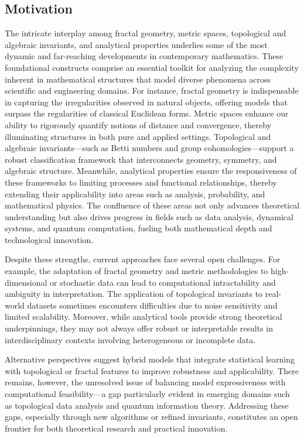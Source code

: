 \documentclass[sigconf]{acmart}
\begin{document}
\maketitle

\subsection{Motivation}

The intricate interplay among fractal geometry, metric spaces, topological and algebraic invariants, and analytical properties underlies some of the most dynamic and far-reaching developments in contemporary mathematics. These foundational constructs comprise an essential toolkit for analyzing the complexity inherent in mathematical structures that model diverse phenomena across scientific and engineering domains. For instance, fractal geometry is indispensable in capturing the irregularities observed in natural objects, offering models that surpass the regularities of classical Euclidean forms. Metric spaces enhance our ability to rigorously quantify notions of distance and convergence, thereby illuminating structures in both pure and applied settings. Topological and algebraic invariants—such as Betti numbers and group cohomologies—support a robust classification framework that interconnects geometry, symmetry, and algebraic structure. Meanwhile, analytical properties ensure the responsiveness of these frameworks to limiting processes and functional relationships, thereby extending their applicability into areas such as analysis, probability, and mathematical physics. The confluence of these areas not only advances theoretical understanding but also drives progress in fields such as data analysis, dynamical systems, and quantum computation, fueling both mathematical depth and technological innovation.

Despite these strengths, current approaches face several open challenges. For example, the adaptation of fractal geometry and metric methodologies to high-dimensional or stochastic data can lead to computational intractability and ambiguity in interpretation. The application of topological invariants to real-world datasets sometimes encounters difficulties due to noise sensitivity and limited scalability. Moreover, while analytical tools provide strong theoretical underpinnings, they may not always offer robust or interpretable results in interdisciplinary contexts involving heterogeneous or incomplete data.

Alternative perspectives suggest hybrid models that integrate statistical learning with topological or fractal features to improve robustness and applicability. There remains, however, the unresolved issue of balancing model expressiveness with computational feasibility—a gap particularly evident in emerging domains such as topological data analysis and quantum information theory. Addressing these gaps, especially through new algorithms or refined invariants, constitutes an open frontier for both theoretical research and practical innovation.
\end{document}
